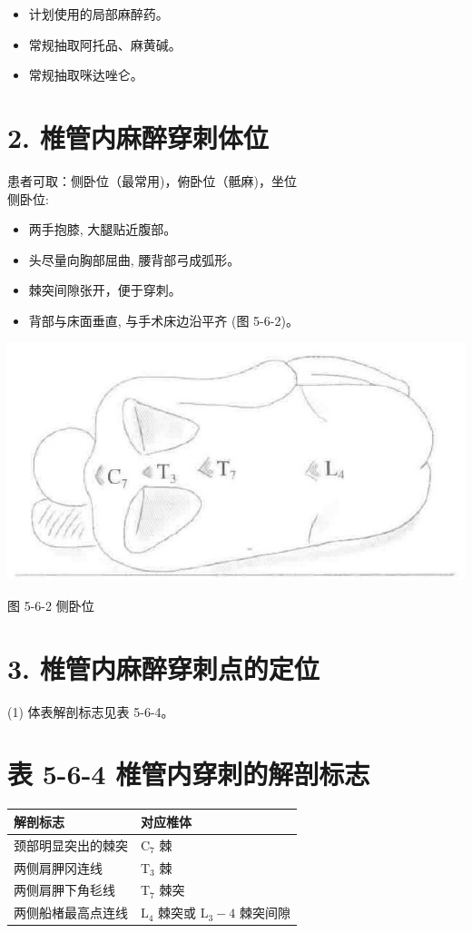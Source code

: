 \documentclass[10pt]{article}
\begin{document}
\begin{itemize}
  \item 计划使用的局部麻醉药。
  \item 常规抽取阿托品、麻黄碱。
  \item 常规抽取咪达唑仑。
\end{itemize}

\section*{2. 椎管内麻醉穿刺体位}
患者可取：侧卧位（最常用)，俯卧位（骶麻)，坐位\\
侧卧位:

\begin{itemize}
  \item 两手抱膝, 大腿贴近腹部。
  \item 头尽量向胸部屈曲, 腰背部弓成弧形。
  \item 棘突间隙张开，便于穿刺。
  \item 背部与床面垂直, 与手术床边沿平齐 (图 5-6-2)。
\end{itemize}

\begin{center}
\includegraphics[max width=\textwidth]{2024_07_05_645bb794a4d4f32ee0c8g-311}
\end{center}

图 5-6-2 侧卧位

\section*{3. 椎管内麻醉穿刺点的定位}
(1) 体表解剖标志见表 5-6-4。

\section*{表 5-6-4 椎管内穿刺的解剖标志}
\begin{center}
\begin{tabular}{ll}
\hline
解剖标志 & 对应椎体 \\
\hline
颈部明显突出的棘突 & $\mathrm{C}_{7}$ 棘 \\
两侧肩胛冈连线 & $\mathrm{T}_{3}$ 棘 \\
两侧肩胛下角毝线 & $\mathrm{T}_{7}$ 棘突 \\
两侧船楮最高点连线 & $\mathrm{L}_{4}$ 棘突或 $\mathrm{L}_{3}-4$ 棘突间隙 \\
\hline
\end{tabular}
\end{center}
\end{document}
